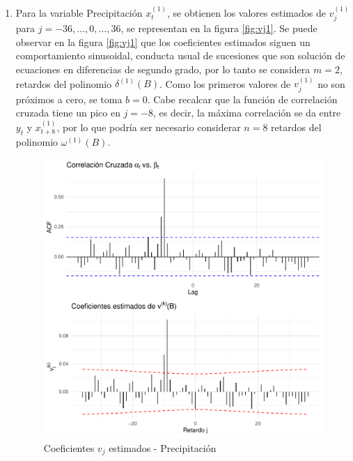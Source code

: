 \documentclass[12pt,oneside]{book}\usepackage[]{graphicx}\usepackage[]{color}
\makeatletter
\def\maxwidth{ %
  \ifdim\Gin@nat@width>\linewidth
    \linewidth
  \else
    \Gin@nat@width
  \fi
}
\newenvironment{knitrout}{}{} %
\theoremstyle{definition} %
\makeatother
\begin{document}
\begin{enumerate}


\item Para la variable Precipitación $x_t^{(1)}$, se obtienen los valores estimados de $v_j^{(1)}$ para $j=-36,\dots , 0, \dots, 36$, se representan en la figura \ref{fig:vj1}. Se puede observar en la figura \ref{fig:vj1} que los coeficientes estimados siguen un comportamiento sinusoidal, conducta usual de sucesiones que son solución de ecuaciones en diferencias de segundo grado, por lo tanto se considera $m=2$, retardos del polinomio $\delta^{(1)}(B)$. Como los primeros valores de $v_j^{(1)}$ no son próximos a cero, se toma $b=0$. Cabe recalcar que la función de correlación cruzada tiene un pico en $j=-8$, es decir, la máxima correlación se da entre $y_t$ y $x_{t+8}^{(1)}$, por lo que podría ser necesario considerar $n=8$ retardos del polinomio $\omega^{(1)}(B)$.



\begin{knitrout}
\color{fgcolor}\begin{figure}[H]

{\centering \includegraphics[width=\maxwidth]{figure/unnamed-chunk-41-1} 

}

\caption{\label{fig:vj1} Coeficientes $v_j$ estimados - Precipitación}\label{fig:unnamed-chunk-41}
\end{figure}



\end{knitrout}
\end{enumerate}
\end{document}
